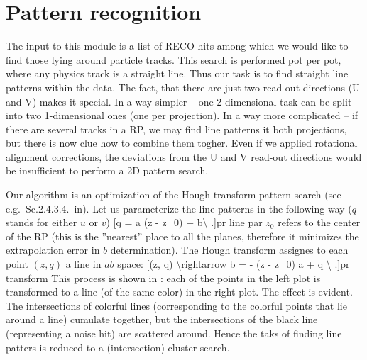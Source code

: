 

\section[pattern reco]{Pattern recognition}

The input to this module is a list of RECO hits among which we would like to find those lying around particle tracks. This search is performed pot per pot, where any physics track is a straight line. Thus our task is to find straight line patterns within the data. The fact, that there are just two read-out directions (U and V) makes it special. In a way simpler -- one 2-dimensional task can be split into two 1-dimensional ones (one per projection). In a way more complicated -- if there are several tracks in a RP, we may find line patterns it both projections, but there is now clue how to combine them togher.
Even if we applied rotational alignment corrections, the deviations from the U and V read-out directions would be insufficient to perform a 2D pattern search. 

Our algorithm is an optimization of the Hough transform pattern search (see e.g.~Sc.2.4.3.4.~in). Let us parameterize the line patterns in the following way ($q$ stands for either $u$ or $v$)
\eqref{q = a (z - z_0) + b\ .}{pr line par}
$z_0$ refers to the center of the RP (this is the ''nearest'' place to all the planes, therefore it minimizes the extrapolation error in $b$ determination). The Hough transform assignes to each point $(z, q)$ a line in $ab$ space:
\eqref{(z, q) \rightarrow b = - (z - z_0) a + q \ .}{pr transform}
This process is shown in : each of the points in the left plot is transformed to a line (of the same color) in the right plot. The effect is evident. The intersections of colorful lines (corresponding to the colorful points that lie around a line) cumulate together, but the intersections of the black line (representing a noise hit) are scattered around. Hence the taks of finding line patters is reduced to a (intersection) cluster search.

